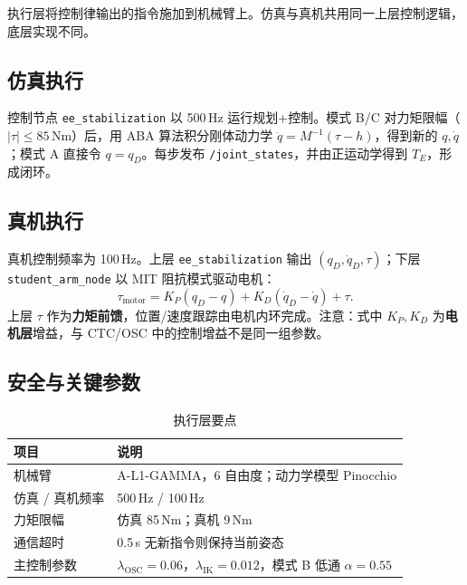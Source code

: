 \documentclass[UTF8, a4paper, 12pt]{ctexart}
\begin{document}
执行层将控制律输出的指令施加到机械臂上。仿真与真机共用同一上层控制逻辑，底层实现不同。

\subsection{仿真执行}

控制节点 \texttt{ee\_stabilization} 以 500\,Hz 运行规划+控制。模式 B/C 对力矩限幅（$|\tau|\le 85$\,Nm）后，用 ABA 算法积分刚体动力学 $\ddot{q}=M^{-1}(\tau-h)$，得到新的 $q,\dot{q}$；模式 A 直接令 $q=q_D$。每步发布 \texttt{/joint\_states}，并由正运动学得到 $T_E$，形成闭环。

\subsection{真机执行}

真机控制频率为 100\,Hz。上层 \texttt{ee\_stabilization} 输出 $(q_D,\dot{q}_D,\tau)$；下层 \texttt{student\_arm\_node} 以 MIT 阻抗模式驱动电机：
\begin{equation}
    \tau_{\mathrm{motor}} = K_P(q_D-q) + K_D(\dot{q}_D-\dot{q}) + \tau.
\end{equation}
上层 $\tau$ 作为\textbf{力矩前馈}，位置/速度跟踪由电机内环完成。注意：式中 $K_P,K_D$ 为\textbf{电机层}增益，与 CTC/OSC 中的控制增益不是同一组参数。

\subsection{安全与关键参数}

\begin{table}[H]
  \centering
  \caption{执行层要点}
  \renewcommand{\arraystretch}{1.15}
  \small
  \begin{tabularx}{\textwidth}{@{} l X @{}}
    \toprule
    项目 & 说明 \\
    \midrule
    机械臂 & A-L1-GAMMA，6 自由度；动力学模型 Pinocchio \\
    仿真 / 真机频率 & 500\,Hz / 100\,Hz \\
    力矩限幅 & 仿真 85\,Nm；真机 9\,Nm \\
    通信超时 & 0.5\,s 无新指令则保持当前姿态 \\
    主控制参数 & $\lambda_{\mathrm{OSC}}=0.06$，$\lambda_{\mathrm{IK}}=0.012$，模式 B 低通 $\alpha=0.55$ \\
    \bottomrule
  \end{tabularx}
\end{table}
\end{document}
